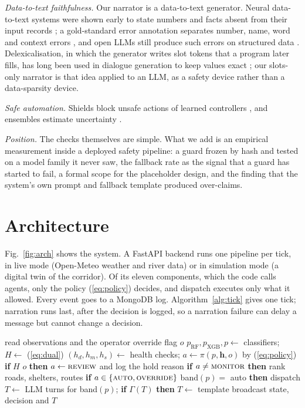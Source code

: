 \documentclass[conference]{IEEEtran}
\begin{document}
\textit{Data-to-text faithfulness.} Our narrator is a data-to-text generator. Neural data-to-text systems were shown early to state numbers and facts absent from their input records \cite{Wiseman2017}; a gold-standard error annotation separates number, name, word and context errors \cite{Thomson2020}, and open LLMs still produce such errors on structured data \cite{Kasner2024}. Delexicalisation, in which the generator writes slot tokens that a program later fills, has long been used in dialogue generation to keep values exact \cite{Wen2015}; our slots-only narrator is that idea applied to an LLM, as a safety device rather than a data-sparsity device.

\textit{Safe automation.} Shields block unsafe actions of learned controllers \cite{Alshiekh2018}, and ensembles estimate uncertainty \cite{Lakshminarayanan2017}.

\textit{Position.} The checks themselves are simple. What we add is an empirical measurement inside a deployed safety pipeline: a guard frozen by hash and tested on a model family it never saw, the fallback rate as the signal that a guard has started to fail, a formal scope for the placeholder design, and the finding that the system's own prompt and fallback template produced over-claims.

\section{Architecture}
\label{sec:arch}
Fig.~\ref{fig:arch} shows the system. A FastAPI backend runs one pipeline per tick, in live mode (Open-Meteo weather and river data) or in simulation mode (a digital twin of the corridor). Of its eleven components, which the code calls agents, only the policy (\ref{eq:policy}) decides, and dispatch executes only what it allowed. Every event goes to a MongoDB log. Algorithm~\ref{alg:tick} gives one tick; narration runs last, after the decision is logged, so a narration failure can delay a message but cannot change a decision.

\begin{algorithm}[t]
\caption{One pipeline tick (after the fix)}
\label{alg:tick}
\begin{algorithmic}[1]
\small
\STATE read observations and the operator override flag $o$
\STATE $p_{\mathrm{RF}},p_{\mathrm{XGB}},p \leftarrow$ classifiers; $H\leftarrow$ (\ref{eq:dual})
\STATE $(h_d,h_m,h_s)\leftarrow$ health checks; $a\leftarrow\pi(p,\mathbf{h},o)$ by (\ref{eq:policy})
\STATE \textbf{if} $H$ \AND \NOT $o$ \textbf{then} $a\leftarrow\textsc{review}$ and log the hold reason
\STATE \textbf{if} $a\neq\textsc{monitor}$ \textbf{then} rank roads, shelters, routes
\STATE \textbf{if} $a\in\{\textsc{auto},\textsc{override}\}$ \AND band$(p)=$ auto \textbf{then} dispatch
\STATE $T\leftarrow$ LLM turns for band$(p)$; \textbf{if} \NOT $\Gamma(T)$ \textbf{then} $T\leftarrow$ template
\STATE broadcast state, decision and $T$
\end{algorithmic}
\end{algorithm}
\end{document}
